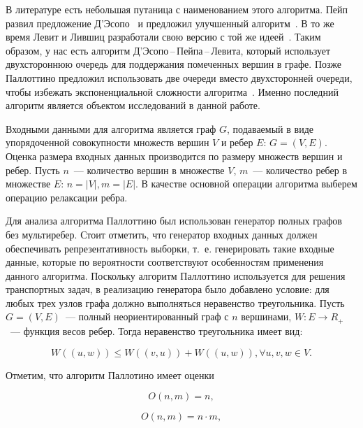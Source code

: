 \documentclass[a4paper,fontsize=14pt]{article}
\begin{document}
В литературе есть небольшая путаница с наименованием этого алгоритма. Пейп развил предложение Д'Эсопо~\cite{desopo} и предложил улучшенный алгоритм~\cite{pape}. В то же время Левит и Лившиц разработали свою версию с той же идеей~\cite{levit_livshits}. Таким образом, у нас есть алгоритм Д'Эсопо\,--\,Пейпа\,--\,Левита, который использует двухстороннюю очередь для поддержания помеченных вершин в графе. Позже Паллоттино предложил использовать две очереди вместо двухсторонней очереди, чтобы избежать экспоненциальной сложности алгоритма~\cite{pallottino}. Именно последний алгоритм является объектом исследований в данной работе.

Входными данными для алгоритма является граф $G$, подаваемый в виде упорядоченной совокупности множеств вершин $V$ и ребер $E$: $G = (V, E)$. Оценка размера входных данных производится по размеру множеств вершин и ребер. Пусть $n$~--- количество вершин в множестве $V$, $m$~--- количество ребер в множестве $E$: $n = |V|, m = |E|$. В качестве основной операции алгоритма выберем операцию релаксации ребра.

Для анализа алгоритма Паллоттино был использован генератор полных графов без мультиребер. Стоит отметить, что генератор входных данных должен обеспечивать репрезентативность выборки, т.~е. генерировать такие входные данные, которые по вероятности соответствуют особенностям применения данного алгоритма. Поскольку алгоритм Паллоттино используется для решения транспортных задач, в реализацию генератора было добавлено условие: для любых трех узлов графа должно выполняться неравенство треугольника. Пусть $G = (V, E)$~--- полный неориентированный граф с $n$ вершинами, $W: E \rightarrow R_+$~--- функция весов ребер. Тогда неравенство треугольника имеет вид:

\begin{equation}\label{eq:triangle_inequality}
W((u, w)) \leq W((v, u)) + W((u, w)), \forall u, v, w \in V.
\end{equation}

Отметим, что алгоритм Паллотино имеет оценки

\begin{equation}\label{eq:pallottino_best}
O(n, m) = n,
\end{equation}

\begin{equation}\label{eq:pallottino_average}
O(n, m) = n \cdot m,
\end{equation}
\end{document}
